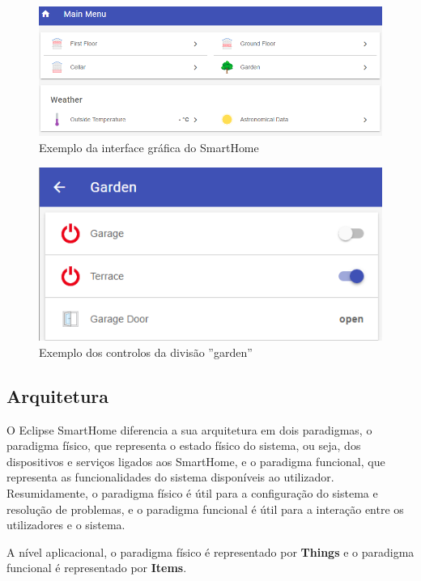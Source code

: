 \begin{itemize}
\begin{figure}[H]
  \centering
        \includegraphics[scale=0.7]{img/smarthome-gui.png}
  \caption{Exemplo da interface gráfica do SmartHome}
\end{figure}

\begin{figure}[H]
  \centering
        \includegraphics[scale=0.7]{img/smarthome-garden.png}
  \caption{Exemplo dos controlos da divisão ''garden''}
\end{figure}

\end{itemize}

\subsection{Arquitetura}

O Eclipse SmartHome diferencia a sua arquitetura em dois paradigmas, o paradigma físico, que representa o estado físico do sistema, ou seja, dos dispositivos e serviços ligados aos SmartHome, e o paradigma funcional, que representa as funcionalidades do sistema disponíveis ao utilizador. Resumidamente, o paradigma físico é útil para a configuração do sistema e resolução de problemas, e o paradigma funcional é útil para a interação entre os utilizadores e o sistema.

A nível aplicacional, o paradigma físico é representado por \textbf{Things} e o paradigma funcional é representado por \textbf{Items}.

